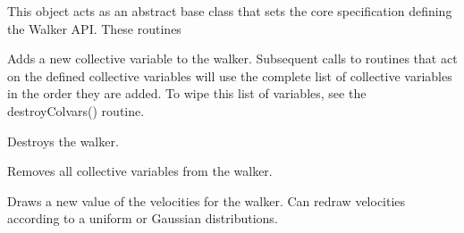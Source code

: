 \documentclass[letterpaper,10pt,english]{sphinxmanual}
\begin{document}
\begin{fulllineitems}
\label{walker_api/walker_api.doc:walker_base.walker}
This object acts as an abstract base class that sets the core specification defining the Walker API. These routines

\begin{fulllineitems}
\label{walker_api/walker_api.doc:walker_base.walker.addColvars}
Adds a new collective variable to the walker. Subsequent calls to routines that act on the defined collective variables will use the complete list of collective variables in the order they are added. To wipe this list of variables, see the destroyColvars() routine.

\end{fulllineitems}


\begin{fulllineitems}
\label{walker_api/walker_api.doc:walker_base.walker.close}
Destroys the walker.

\end{fulllineitems}


\begin{fulllineitems}
\label{walker_api/walker_api.doc:walker_base.walker.destroyColvars}
Removes all collective variables from the walker.

\end{fulllineitems}


\begin{fulllineitems}
\label{walker_api/walker_api.doc:walker_base.walker.drawVel}
Draws a new value of the velocities for the walker. Can redraw velocities according to a uniform or Gaussian distributions.

\end{fulllineitems}


\begin{fulllineitems}
\label{walker_api/walker_api.doc:walker_base.walker.equilibrate}
\end{fulllineitems}


\end{fulllineitems}
\end{document}
